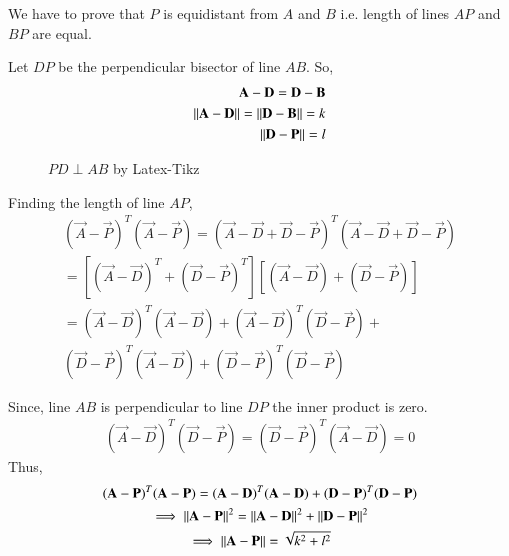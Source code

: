 
We have to prove that $P$ is equidistant from $A$ and $B$ i.e. length of lines $AP$ and $BP$ are equal. 

Let $DP$ be the perpendicular bisector of line $AB$. So,
\begin{align}
    \mathbf{A}-\mathbf{D} = \mathbf{D} - \mathbf{B} \\
    \left\lVert\mathbf{A}-\mathbf{D}\right\rVert = \left\lVert\mathbf{D} - \mathbf{B}\right\rVert = k \\
    \left\lVert\mathbf{D}-\mathbf{P}\right\rVert = l
\end{align}

\renewcommand{\thefigure}{1}
\begin{figure}[!ht]
\centering
\resizebox{\columnwidth}{!}{}
\caption{$PD \perp AB$ by Latex-Tikz}
\label{fig:solutions/1/20/perp_bisector}
\end{figure}


Finding the length of line $AP$, 
\begin{multline}
    (\vec{A}-\vec{P})^T(\vec{A}-\vec{P}) = (\vec{A}- \vec{D}+\vec{D}-\vec{P})^T(\vec{A}-\vec{D}+\vec{D}-\vec{P}) \\
    =[(\vec{A}-\vec{D})^T+(\vec{D}-\vec{P})^T][(\vec{A}-\vec{D})+(\vec{D}-\vec{P})] \\
    =(\vec{A}-\vec{D})^T(\vec{A}-\vec{D}) + (\vec{A}-\vec{D})^T(\vec{D}-\vec{P}) + \\ (\vec{D}-\vec{P})^T(\vec{A}-\vec{D}) + (\vec{D}-\vec{P})^T(\vec{D}-\vec{P})
\end{multline}

Since, line $AB$ is perpendicular to line $DP$ the inner product is zero. 
\begin{align}
    (\vec{A}-\vec{D})^T(\vec{D}-\vec{P}) = (\vec{D}-\vec{P})^T(\vec{A}-\vec{D}) = 0
\end{align}
Thus, 
\begin{multline} \label{eq:solutions/1/20/len_ap}
    (\mathbf{A}-\mathbf{P})^T(\mathbf{A}-\mathbf{P}) = (\mathbf{A}-\mathbf{D})^T(\mathbf{A}-\mathbf{D}) + (\mathbf{D}-\mathbf{P})^T(\mathbf{D}-\mathbf{P}) \\
  \implies\left\lVert\mathbf{A}-\mathbf{P}\right\rVert^2 = \left\lVert\mathbf{A}-\mathbf{D}\right\rVert^2 + \left\lVert\mathbf{D}-\mathbf{P}\right\rVert^2 \\
  \implies\left\lVert\mathbf{A}-\mathbf{P}\right\rVert = \sqrt{k^2+l^2}
\end{multline}

